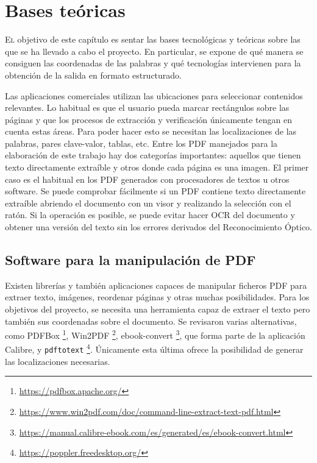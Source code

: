 
\chapter{Bases teóricas}
\label{chap:bases-teoricas}

\lettrine{E}{l} objetivo de este capítulo es sentar las bases tecnológicas y teóricas sobre las que se ha llevado a cabo el proyecto. En particular, se expone de qué manera se consiguen las coordenadas de las palabras y qué tecnologías intervienen para la obtención de la salida en formato estructurado.

Las aplicaciones comerciales utilizan las ubicaciones para seleccionar contenidos relevantes. Lo habitual es que el usuario pueda marcar rectángulos sobre las páginas y que los procesos de extracción y verificación únicamente tengan en cuenta estas áreas. Para poder hacer esto se necesitan las localizaciones de las palabras, pares clave-valor, tablas, etc. Entre los PDF manejados para la elaboración de este trabajo hay dos categorías importantes: aquellos que tienen texto directamente extraíble y otros donde cada página es una imagen. El primer caso es el habitual en los PDF generados con procesadores de textos u otros software. Se puede comprobar fácilmente si un PDF contiene texto directamente extraíble abriendo el documento con un visor y realizando la selección con el ratón. Si la operación es posible, se puede evitar hacer OCR del documento y obtener una versión del texto sin los errores derivados del Reconocimiento Óptico.

\section{Software para la manipulación de PDF}

Existen librerías y también aplicaciones capaces de manipular ficheros PDF para extraer texto, imágenes, reordenar páginas y otras muchas posibilidades. Para los objetivos del proyecto, se necesita una herramienta capaz de extraer el texto pero también sus coordenadas sobre el documento. Se revisaron varias alternativas, como PDFBox 
\footnote{\url{https://pdfbox.apache.org/}}, Win2PDF 
\footnote{\url{https://www.win2pdf.com/doc/command-line-extract-text-pdf.html}}, ebook-convert 
\footnote{\url{https://manual.calibre-ebook.com/es/generated/es/ebook-convert.html}}, que forma parte de la aplicación Calibre, y \verb|pdftotext| 
\footnote{\url{https://poppler.freedesktop.org/}}. Únicamente esta última ofrece la posibilidad de generar las localizaciones necesarias.

